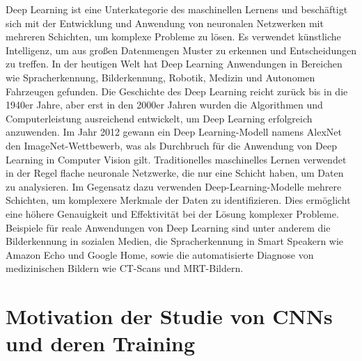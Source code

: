     Deep Learning ist eine Unterkategorie des maschinellen Lernens und beschäftigt sich mit der Entwicklung und Anwendung von neuronalen Netzwerken mit mehreren Schichten, um komplexe Probleme zu lösen. Es verwendet künstliche Intelligenz, um aus großen Datenmengen Muster zu erkennen und Entscheidungen zu treffen. 
    In der heutigen Welt hat Deep Learning Anwendungen in Bereichen wie Spracherkennung, Bilderkennung, Robotik, Medizin und Autonomen Fahrzeugen gefunden. 
    Die Geschichte des Deep Learning reicht zurück bis in die 1940er Jahre, aber erst in den 2000er Jahren wurden die Algorithmen und Computerleistung ausreichend entwickelt, um Deep Learning erfolgreich anzuwenden. 
    Im Jahr 2012 gewann ein Deep Learning-Modell namens AlexNet den ImageNet-Wettbewerb, was als Durchbruch für die Anwendung von Deep Learning in Computer Vision gilt.
    Traditionelles maschinelles Lernen verwendet in der Regel flache neuronale Netzwerke, die nur eine Schicht haben, um Daten zu analysieren. 
    Im Gegensatz dazu verwenden Deep-Learning-Modelle mehrere Schichten, um komplexere Merkmale der Daten zu identifizieren. 
    Dies ermöglicht eine höhere Genauigkeit und Effektivität bei der Lösung komplexer Probleme.
    Beispiele für reale Anwendungen von Deep Learning sind unter anderem die Bilderkennung in sozialen Medien, die Spracherkennung in Smart Speakern wie Amazon Echo und Google Home, sowie die automatisierte Diagnose von medizinischen Bildern wie CT-Scans und MRT-Bildern.

\section{Motivation der Studie von CNNs und deren Training}
    
